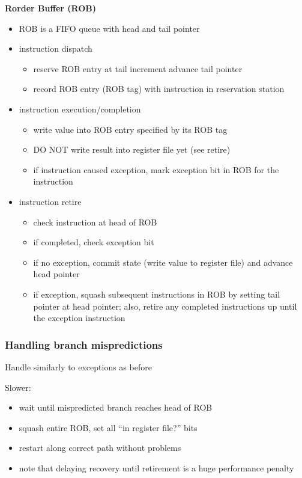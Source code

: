 \documentclass[12pt]{extarticle}
\begin{document}
	\textbf{Rorder Buffer (ROB)}

	\begin{itemize}
		\item ROB is a FIFO queue with head and tail pointer
		\item instruction dispatch
		\begin{itemize}
			\item reserve ROB entry at tail increment advance tail pointer
			\item record ROB entry (ROB tag) with instruction in reservation station
		\end{itemize}

		\item instruction execution/completion
		\begin{itemize}
			\item write value into ROB entry specified by its ROB tag
			\item DO NOT write result into register file yet (see retire)
			\item if instruction caused exception, mark exception bit in ROB for the instruction
		\end{itemize}

		\item instruction retire
		\begin{itemize}
			\item check instruction at head of ROB
			\item if completed, check exception bit
			\item if no exception, commit state (write value to register file) and advance head pointer
			\item if exception, squash subsequent instructions in ROB by setting tail pointer at head pointer; also, 
			retire any completed instructions up until the exception instruction
		\end{itemize}
	\end{itemize}

	\subsubsection{Handling branch mispredictions}

	Handle similarly to exceptions as before

	Slower:

	\begin{itemize}
		\item wait until mispredicted branch reaches head of ROB
		\item squash entire ROB, set all ``in register file?'' bits
		\item restart along correct path without problems
		\item note that delaying recovery until retirement is a huge performance penalty
	\end{itemize}
\end{document}

